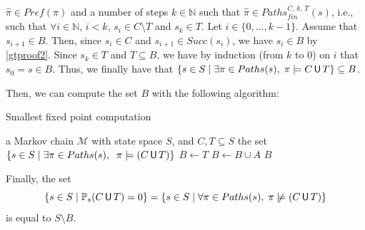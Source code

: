 \begin{proof2}
\begin{enumerate}
  $\hat{\pi} \in Pref(\pi)$ and a number of steps $k \in \mathbb{N}$ such that $\hat{\pi} \in Paths_{fin}^{C, \, k, \, T}(s)$, i.e., such that $\forall i \in \mathbb{N}$, $i < k$, $s_i \in C \setminus T$ and $s_k \in T$.
    Let $i \in \{0, \dots, k-1\}$.
    Assume that $s_{i+1} \in B$. Then, since $s_i \in C$ and $s_{i+1} \in Succ(s_i)$, we have $s_i \in B$ by \ref{gtproof2}.
  Since $s_k \in T$ and $T \subseteq B$, we have by induction (from $k$ to $0$) on $i$ that $s_0=s \in B$.
  Thus, we finally have that $\{s \in S \; | \; \exists \pi \in Paths(s), \; \pi \models C \,\text{\sffamily U}\, T\} \subseteq B$.
\end{enumerate}
Then, we can compute the set $B$ with the following algorithm:
\begin{algorithm}[H]
\caption{Smallest fixed point computation}
\begin{algorithmic}[1]
  \REQUIRE a Markov chain $\mathcal{M}$ with state space $S$, and $C, T \subseteq S$
  \ENSURE the set $\{ s \in S \; | \; \exists \pi \in Paths(s), \;\; \pi \models (C \,\text{\sffamily U}\, T) \}$
  \STATE $B \leftarrow T$
    \STATE $B \leftarrow B \cup A$
  \ENDWHILE
  \RETURN $B$
\end{algorithmic}
\end{algorithm}
Finally, the set \[\{s \in S \; | \; \mathbb{P}_s(C \U T) = 0 \} = \{s \in S \; | \; \forall \pi \in Paths(s), \; \pi \centernot \models (C \U T) \}\] is equal to $S \setminus B$.
\end{proof2}

